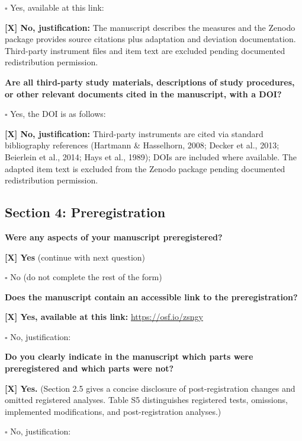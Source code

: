 \documentclass[
  12pt,
]{article}
\begin{document}
\quad $\square$ Yes, available at this link:

\textbf{[X] No, justification:} The manuscript describes the measures and the Zenodo package provides source citations plus adaptation and deviation documentation. Third-party instrument files and item text are excluded pending documented redistribution permission.

\bigskip

\textbf{Are all third-party study materials, descriptions of study procedures, or other relevant documents cited in the manuscript, with a DOI?}

\quad $\square$ Yes, the DOI is as follows:

\textbf{[X] No, justification:} Third-party instruments are cited via standard bibliography references (Hartmann \& Hasselhorn, 2008; Decker et al., 2013; Beierlein et al., 2014; Hays et al., 1989); DOIs are included where available. The adapted item text is excluded from the Zenodo package pending documented redistribution permission.

\bigskip

\hypertarget{section-4-preregistration}{%
\subsection*{Section 4: Preregistration}\label{section-4-preregistration}}

\textbf{Were any aspects of your manuscript preregistered?}

\textbf{[X] Yes} (continue with next question)

\quad $\square$ No (do not complete the rest of the form)

\bigskip

\textbf{Does the manuscript contain an accessible link to the preregistration?}

\textbf{[X] Yes, available at this link:} \url{https://osf.io/zsngy}

\quad $\square$ No, justification:

\bigskip

\textbf{Do you clearly indicate in the manuscript which parts were preregistered and which parts were not?}

\textbf{[X] Yes.} (Section 2.5 gives a concise disclosure of post-registration changes and omitted registered analyses. Table S5 distinguishes registered tests, omissions, implemented modifications, and post-registration analyses.)

\quad $\square$ No, justification:
\end{document}
